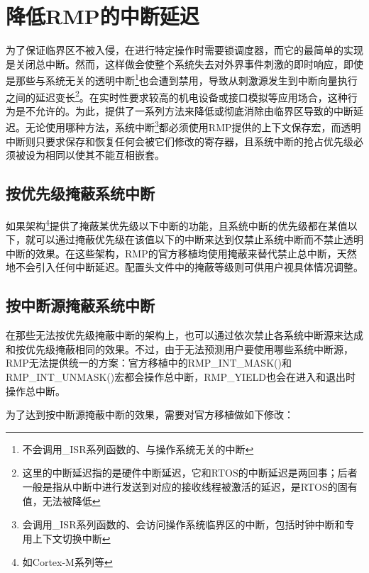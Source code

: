 \section{降低RMP的中断延迟}\label{sec:reducing-the-interrupt-latency-of-rmp}

为了保证临界区不被入侵，在进行特定操作时需要锁调度器，而它的最简单的实现是关闭总中断。然而，这样做会使整个系统失去对外界事件刺激的即时响应，即使是那些与系统无关的透明中断\footnote{不会调用\_ISR系列函数的、与操作系统无关的中断}也会遭到禁用，导致从刺激源发生到中断向量执行之间的延迟变长\footnote{这里的中断延迟指的是硬件中断延迟，它和RTOS的中断延迟是两回事；后者一般是指从中断中进行发送到对应的接收线程被激活的延迟，是RTOS的固有值，无法被降低}。在实时性要求较高的机电设备或接口模拟等应用场合，这种行为是不允许的。为此，提供了一系列方法来降低或彻底消除由临界区导致的中断延迟。无论使用哪种方法，系统中断\footnote{会调用\_ISR系列函数的、会访问操作系统临界区的中断，包括时钟中断和专用上下文切换中断}都必须使用RMP提供的上下文保存宏，而透明中断则只要求保存和恢复任何会被它们修改的寄存器，且系统中断的抢占优先级必须被设为相同以使其不能互相嵌套。

\subsection{按优先级掩蔽系统中断}\label{subsec:masking-system-interrupts-by-priority}

如果架构\footnote{如Cortex-M系列等}提供了掩蔽某优先级以下中断的功能，且系统中断的优先级都在某值以下，就可以通过掩蔽优先级在该值以下的中断来达到仅禁止系统中断而不禁止透明中断的效果。在这些架构，RMP的官方移植均使用掩蔽来替代禁止总中断，天然地不会引入任何中断延迟。配置头文件中的掩蔽等级则可供用户视具体情况调整。

\subsection{按中断源掩蔽系统中断}\label{subsec:masking-system-interrupts-by-source}

\protect{}\label{subsec:masking-system-interrupts-by-source-2}在那些无法按优先级掩蔽中断的架构上，也可以通过依次禁止各系统中断源来达成和按优先级掩蔽相同的效果。不过，由于无法预测用户要使用哪些系统中断源，RMP无法提供统一的方案：官方移植中的RMP\_INT\_MASK()和RMP\_INT\_UNMASK()宏都会操作总中断，RMP\_YIELD也会在进入和退出时操作总中断。

为了达到按中断源掩蔽中断的效果，需要对官方移植做如下修改：

